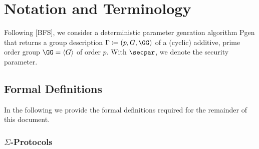 \documentclass[runningheads]{llncs}
\begin{document}
\section{Notation and Terminology}

Following [BFS], we consider a deterministic parameter genration algorithm Pgen that returns a group description $\Gamma \defeq (p, G, \GG)$ of a (cyclic) additive, prime order group $\GG = \langle G \rangle$ of order $p$. With $\secpar$, we denote the security parameter.

\subsection{Formal Definitions}
  In the following we provide the formal definitions required for the remainder of this document.

    
\subsubsection{$\Sigma$-Protocols}~\\
\end{document}
